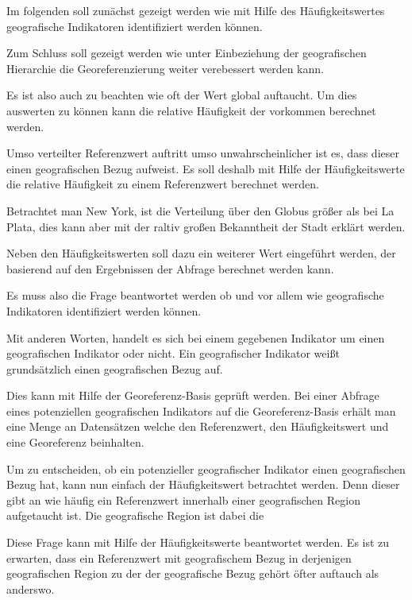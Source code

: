 		Im folgenden soll zunächst gezeigt werden wie mit Hilfe des Häufigkeitswertes geografische Indikatoren identifiziert werden können.

		Zum Schluss soll gezeigt werden wie unter Einbeziehung der geografischen Hierarchie die Georeferenzierung weiter verebessert werden kann.  

				



				Es ist also auch zu beachten wie oft der Wert global auftaucht. 
				Um dies auswerten zu können kann die relative Häufigkeit der vorkommen berechnet werden. 


				Umso verteilter Referenzwert auftritt umso unwahrscheinlicher ist es, dass dieser einen geografischen Bezug aufweist.
				Es soll deshalb mit Hilfe der Häufigkeitswerte die relative Häufigkeit zu einem Referenzwert berechnet werden.

				Betrachtet man New York, ist die Verteilung über den Globus größer als bei La Plata, dies kann aber mit der raltiv großen Bekanntheit der Stadt erklärt werden.



				Neben den Häufigkeitswerten soll dazu ein weiterer Wert eingeführt werden, der basierend auf den Ergebnissen der Abfrage berechnet werden kann.


			Es muss also die Frage beantwortet werden ob und vor allem wie geografische Indikatoren identifiziert werden können. 



			Mit anderen Worten, handelt es sich bei einem gegebenen Indikator um einen geografischen Indikator oder nicht.
			Ein geografischer Indikator weißt grundsätzlich einen geografischen Bezug auf. 

			Dies kann mit Hilfe der Georeferenz-Basis geprüft werden.
			Bei einer Abfrage eines potenziellen geografischen Indikators auf die Georeferenz-Basis erhält man eine Menge an Datensätzen welche den Referenzwert, den Häufigkeitswert und eine Georeferenz beinhalten.

			Um zu entscheiden, ob ein potenzieller geografischer Indikator einen geografischen Bezug hat, kann nun einfach der Häufigkeitswert betrachtet werden.
			Denn dieser gibt an wie häufig ein Referenzwert innerhalb einer geografischen Region aufgetaucht ist. 
			Die geografische Region ist dabei die  


			Diese Frage kann mit Hilfe der Häufigkeitswerte beantwortet werden.
			Es ist zu erwarten, dass ein Referenzwert mit geografischem Bezug in derjenigen geografischen Region zu der der geografische Bezug gehört öfter auftauch als anderswo.


